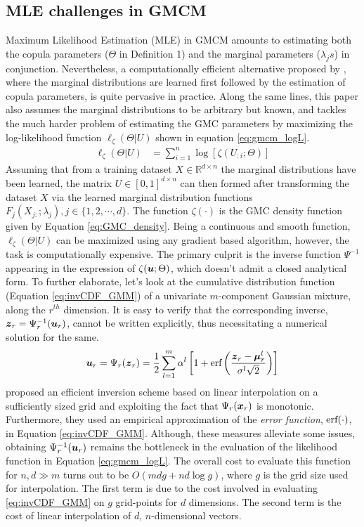 \documentclass{article}
\begin{document}
\subsection{MLE challenges in GMCM}\label{subsec:MLE_GMCM}
Maximum Likelihood Estimation (MLE) in GMCM amounts to estimating both the copula parameters ($\Theta$ in Definition 1) and the marginal parameters  ($\lambda_js$) in conjunction. Nevertheless, a computationally efficient alternative proposed by \citet{Joe1996IFM}, where the marginal distributions are learned first followed by the estimation of copula parameters, is quite pervasive in practice. Along the same lines, this paper also assumes the marginal distributions to be arbitrary but known, and tackles the much harder problem of estimating the GMC parameters by maximizing the log-likelihood function $\ell_{\zeta}(\Theta|U)$ shown in equation \eqref{eq:gmcm_logL}.
\begin{align} \label{eq:gmcm_logL}
\ell_\zeta(\Theta |U) &= \sum\limits_{i=1}^{n} \log \left[\zeta(U_{:i};\Theta)\right]
\end{align}
Assuming that from a training dataset $X \in \mathbb{R}^{d \times n}$ the marginal distributions have been learned, the matrix $U \in [0 , 1]^{d\times n}$ can then formed after transforming the dataset $X$ via the learned marginal distribution functions $F_j(X_{j:};\lambda_j), j\in\{1,2,\cdots,d\}$. The function $\zeta(\cdot)$ is the GMC density function given by Equation \eqref{eq:GMC_density}. Being a continuous and smooth function, $\ell_\zeta(\Theta |U)$ can be maximized using any gradient based algorithm, however, the task is computationally expensive. The primary culprit is the inverse function $\Psi^{-1}$ appearing in the expression of $\zeta(\boldsymbol{u};\Theta)$, which doesn't admit a closed analytical form. To further elaborate, let's look at the cumulative distribution function (Equation \ref{eq:invCDF_GMM}) of a univariate  $m$-component Gaussian mixture, along the $r^{th}$ dimension.  It is easy to verify that the corresponding inverse, $\boldsymbol{z}_r=\Psi_r^{-1}(\boldsymbol{u}_r)$, cannot be written explicitly, thus necessitating a numerical solution for the same.
\begin{equation} \label{eq:invCDF_GMM}
\boldsymbol{u}_r=\Psi_r(\boldsymbol{z}_r)= \frac{1}{2}\sum\limits_{l=1}^{m} \alpha^l \left[1 + \textmd{erf}\left( \frac{\boldsymbol{z}_r-\boldsymbol{\mu}^l_r}{\sigma^l\sqrt{2}}\right) \right]
\end{equation} 
\citet{Bilgrau2016} proposed an efficient inversion scheme based on linear interpolation on a sufficiently sized grid and exploiting the fact that $\Psi_r(\boldsymbol{x}_r)$ is monotonic. Furthermore, they used an empirical approximation of the \emph{error function}, $\textmd{erf}(\cdot)$, in Equation \ref{eq:invCDF_GMM}. Although, these measures alleviate some issues, obtaining $\Psi_r^{-1}(\boldsymbol{u}_r)$ remains the bottleneck in the evaluation of the likelihood function in Equation \eqref{eq:gmcm_logL}. The overall cost to evaluate this function for $n,d \gg m$ turns out to be $O(mdg + nd\log{g})$, where $g$ is the grid size used for interpolation. The first term is due to the cost involved in evaluating \eqref{eq:invCDF_GMM} on $g$ grid-points for $d$ dimensions. The second term is the cost of linear interpolation of $d$, $n$-dimensional vectors.  
\end{document}
